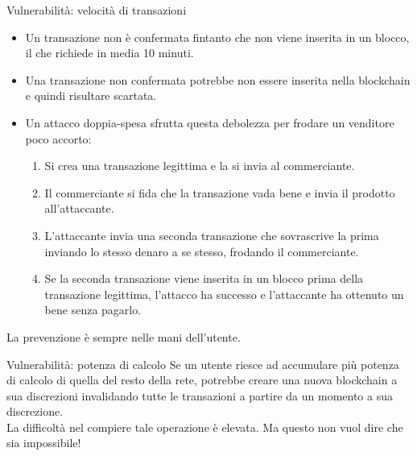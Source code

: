 \documentclass[italian]{beamer}
\begin{document}
\begin{frame}{Vulnerabilità: velocità di transazioni}
 \begin{itemize}
  \item Un transazione non è confermata fintanto che non viene inserita in un blocco, il che richiede in media 10 minuti.
  \item Una transazione non confermata potrebbe non essere inserita nella blockchain e quindi risultare scartata.
  \item Un attacco doppia-spesa sfrutta questa debolezza per frodare un venditore poco accorto: \pause
  \begin{enumerate}
   \item Si crea una transazione legittima e la si invia al commerciante. \pause
   \item Il commerciante si fida che la transazione vada bene e invia il prodotto all'attaccante. \pause
   \item L'attaccante invia una seconda transazione che sovrascrive la prima inviando lo stesso denaro a se stesso, frodando il commerciante. \pause
   \item Se la seconda transazione viene inserita in un blocco prima della transazione legittima, l'attacco ha successo e l'attaccante ha ottenuto un bene senza pagarlo.
  \end{enumerate}
 \end{itemize}
 \pause
 La prevenzione è sempre nelle mani dell'utente.
\end{frame}

\begin{frame}{Vulnerabilità: potenza di calcolo}
 Se un utente riesce ad accumulare più potenza di calcolo di quella del resto della rete, potrebbe creare una nuova blockchain a sua discrezioni invalidando tutte le transazioni a partire da un momento a sua discrezione.\\
 \pause
 La difficoltà nel compiere tale operazione è elevata.
 \pause
 Ma questo non vuol dire che sia impossibile!
\end{frame}
\end{document}
